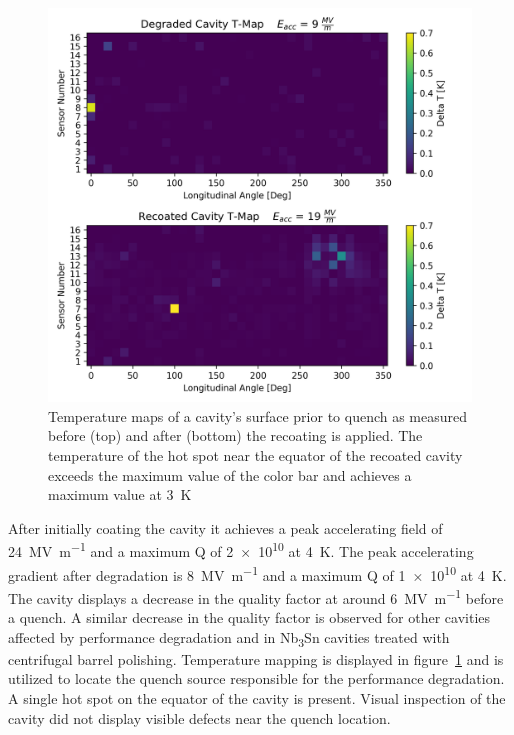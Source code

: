 \documentclass{revtex4-2}
\begin{document}
\begin{figure}[h]%
    \centering%
    \includegraphics{./figures/TMAP.png}%
    \caption{Temperature maps of a cavity's surface prior to quench as measured before (top) and after (bottom) the recoating is applied. The temperature of the hot spot near the equator of the recoated cavity exceeds the maximum value of the color bar and achieves a maximum value at \qty{3}{\kelvin}}%
    \label{fig:TMAP}%
\end{figure}

After initially coating the cavity it achieves a peak accelerating field of \qty{24}{\mega\volt\per\meter} and a maximum Q of \num{2e10} at \qty{4}{\kelvin}. The peak accelerating gradient after degradation is \qty{8}{\mega\volt\per\meter} and a maximum Q of \num{1e10} at \qty{4}{\kelvin}. The cavity displays a decrease in the quality factor at around \qty{6}{\mega\volt\per\meter} before a quench. A similar decrease in the quality factor is observed for other cavities affected by performance degradation\cite{eremeev2023preservation,eremeev:srf2019-mop015} and in Nb\textsubscript{3}Sn cavities treated with centrifugal barrel polishing\cite{viklund2024improving}. Temperature mapping is displayed in figure~\ref{fig:TMAP} and is utilized to locate the quench source responsible for the performance degradation. A single hot spot on the equator of the cavity is present. Visual inspection of the cavity did not display visible defects near the quench location.
\end{document}
